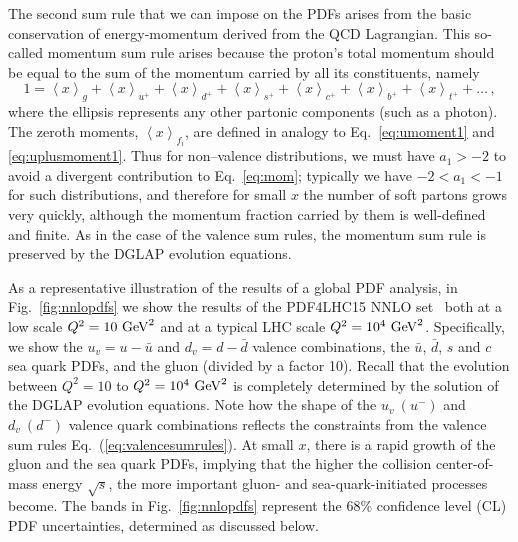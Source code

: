 The second sum rule that we can impose on the PDFs arises
from the basic conservation of energy-momentum derived from
the QCD Lagrangian.
%
This so-called momentum sum rule arises
because the proton's total momentum should be equal to the sum of the momentum
carried by all its constituents, namely
\begin{equation}\label{eq:mom}
1 = \left\langle x\right\rangle _{g}+\left\langle x\right\rangle _{u^{+}}+\left\langle x\right\rangle _{d^{+}}+\left\langle x\right\rangle _{s^{+}}+\left\langle x\right\rangle _{c^{+}}+\left\langle x\right\rangle _{b^{+}}+\left\langle x\right\rangle _{t^{+}}+\ldots\,,
\end{equation}
%
where the ellipsis represents any other partonic components (such
as a photon). The zeroth moments, $\left\langle x\right\rangle _{f_i}$, are defined in analogy to Eq.~\eqref{eq:umoment1} and \eqref{eq:uplusmoment1}. Thus for non--valence distributions, we must have $a_1>-2$ to avoid a divergent contribution to
Eq.~\eqref{eq:mom}; typically we have $-2<a_1<-1$ for such distributions, and therefore for small $x$ the number of soft partons
grows very quickly, although the momentum fraction carried by them is well-defined
and finite.
%
As in the case of the valence sum rules, the momentum
sum rule is preserved by the DGLAP evolution equations.

As a representative illustration of the results of a global
PDF analysis, in Fig.~\ref{fig:nnlopdfs} we show
the results of the PDF4LHC15 NNLO set~\cite{Butterworth:2015oua}
both at a low scale
    $Q^2=10~{\rm GeV}^2$  and at a typical LHC scale
    $Q^2=10^4~{\rm GeV}^2$.
    Specifically, we show the  $u_v=u-\bar{u}$ and $d_v=d-\bar{d}$ valence combinations, the $\bar{u}$,
    $\bar{d}$, $s$ and $c$ sea quark PDFs, and the gluon (divided by a factor 10).
    Recall that the evolution between $Q^2=10$ to $Q^2=10^4~{\rm GeV}^2$ is completely
    determined by the solution of
     the DGLAP evolution equations.
    Note how the shape of the $u_v~(u^{-})$ and $d_v~(d^{-})$ valence quark combinations
    reflects the constraints from the valence sum rules Eq.~(\ref{eq:valencesumrules}).
    At small $x$, there is a rapid growth of the gluon and the sea quark PDFs, implying
    that the higher the collision center-of-mass energy $\sqrt{s}$, the more
    important gluon- and sea-quark-initiated processes become.
    The bands in Fig.~\ref{fig:nnlopdfs} represent the 68\% confidence level (CL)
    PDF uncertainties, determined as discussed below.

